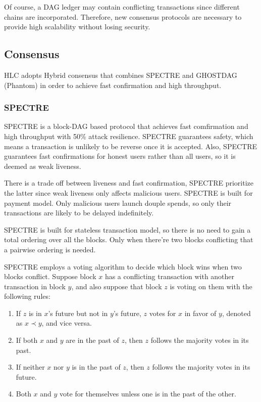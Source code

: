 \documentclass[a4paper,11pt]{article}
\begin{document}
Of course, a DAG ledger may contain conflicting transactions since different
chains are incorporated. Therefore, new consensus protocols are necessary to
provide high scalability without losing security.

\subsection{Consensus}
HLC adopts Hybrid consensus that combines SPECTRE and GHOSTDAG (Phantom) in order to achieve fast confirmation and high throughput.


\subsubsection*{SPECTRE}
SPECTRE is a block-DAG based protocol that achieves fast comfirmation and high throughput with 50\% attack resilience. SPECTRE guarantees safety, which means a transaction is unlikely to be reverse once it is accepted. Also, SPECTRE guarantees fast confirmations for honest users rather than all users, so it is deemed as weak liveness.

There is a trade off between liveness and fast confirmation, SPECTRE prioritize
the latter since weak liveness only affects malicious users. SPECTRE is built
for payment model. Only malicious users launch douple spends, so only their
transactions are likely to be delayed indefinitely.

SPECTRE is built for stateless transaction model, so there is no need to gain a
total ordering over all the blocks. Only when there're two blocks conflicting
that a pairwise ordering is needed.

SPECTRE employs a voting algorithm to decide which block wins when two blocks
conflict. Suppose block $x$ has a conflicting transaction with another
transaction in block $y$, and also suppose that block $z$ is voting on them with
the following rules:


\begin{enumerate}
	\item If $z$ is in $x$'s future but not in $y$'s future, $z$ votes for
		$x$ in favor of $y$, denoted as $x \prec y$, and vice versa.
	\item If both $x$ and $y$ are in the past of $z$, then $z$ follows the majority votes in its past.
	\item If neither $x$ nor $y$ is in the past of $z$, then $z$ follows the majority votes in its future.
	\item Both $x$ and $y$ vote for themselves unless one is in the past of
		the other.
\end{enumerate}
\end{document}
